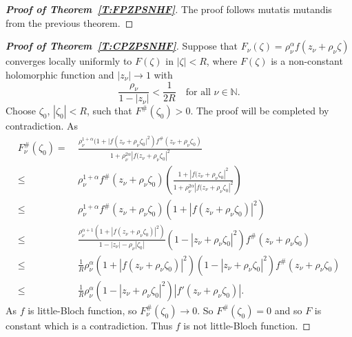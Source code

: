 \documentclass[10pt,a4paper]{amsart}
\numberwithin{equation}{section}
\begin{document}
\begin{proof}[{\bf Proof of Theorem~\ref{T:FPZPSNHF}}]
The proof follows mutatis mutandis from the previous theorem. 
\end{proof}
\begin{proof}[{\bf Proof of Theorem~\ref{T:CPZPSNHF}}]
Suppose that 
$
F_{\nu}(\zeta) =\rho_{\nu} ^{\alpha} f(z_{\nu} + \rho_{\nu}  \zeta)
$
converges locally uniformly to $F(\zeta)$ in $|\zeta| < R$, where $F(\zeta)$ is a non-constant holomorphic function and $|z_{\nu}| \to 1$ with 
\begin{equation*}
\frac{\rho_{\nu} }{1 - |z_{\nu}|} < \frac{1}{2R}
\quad \text{for all } \nu \in \mathbb{N}.
\end{equation*}
Choose $\zeta_0$, $|\zeta_0| < R$, such that $F^\#(\zeta_0) > 0$.
The proof will be completed by contradiction.
As 
\begin{align*}
    F_{\nu}^\#(\zeta_0)=&~\frac{\rho_{\nu} ^{1+\alpha}(1+|f(z_{\nu}+\rho_{\nu} \zeta_0|^2)f^\#(z_{\nu}+\rho_{\nu} \zeta_0)}{1+\rho_{\nu} ^{2\alpha}|f(z_{\nu}+\rho_{\nu} \zeta_0|^2}\\
    \le&~\rho_{\nu} ^{1+\alpha}f^\#(z_{\nu}+\rho_{\nu} \zeta_0)\left(\frac{1+|f(z_{\nu}+\rho_{\nu} \zeta_0|^2}{1+\rho_{\nu} ^{2\alpha}|f(z_{\nu}+\rho_{\nu} \zeta_0|^2}\right)\\
    \le&~\rho_{\nu} ^{1+\alpha}f^\#(z_{\nu}+\rho_{\nu} \zeta_0)\left(1+|f(z_{\nu}+\rho_{\nu} \zeta_0)|^2\right)\\
    \le&~ \frac{\rho_{\nu} ^{\alpha+1}\left(1+|f(z_{\nu}+\rho_{\nu} \zeta_0)|^2\right)}{1-|z_{\nu}|-\rho_{\nu} |\zeta_0|}\left(1-|z_{\nu}+\rho_{\nu} \zeta_0|^2 \right)f^\#(z_{\nu}+\rho_{\nu} \zeta_0)\\
    \le&~ \frac{1}{R}\rho_{\nu} ^{\alpha}\left(1+|f(z_{\nu}+\rho_{\nu} \zeta_0)|^2\right)\left(1-|z_{\nu}+\rho_{\nu} \zeta_0|^2 \right)f^\#(z_{\nu}+\rho_{\nu} \zeta_0)\\
    \le&~ \frac{1}{R}\rho_{\nu} ^{\alpha}\left(1-|z_{\nu}+\rho_{\nu} \zeta_0|^2 \right)|f'(z_{\nu}+\rho_{\nu} \zeta_0)|.
\end{align*}
As $f$ is little-Bloch function, so $F_{\nu}^{\#}(\zeta_0)\to 0$. So $F^\#(\zeta_0)=0$ and so $F$ is 
constant which is a contradiction. Thus $f$ is not little-Bloch function.
\end{proof}
\end{document}
